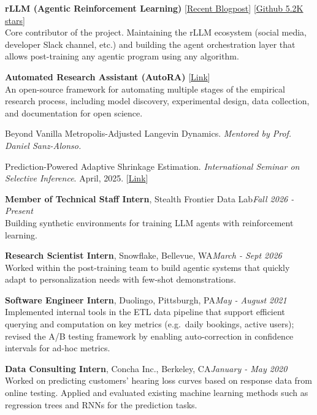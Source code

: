 \documentclass[10pt,letterpaper]{article}
\newlength{\labw}\setlength{\labw}{1.15in}
\newenvironment{sect}[1]{%
  \begin{list}{}{\setlength{\leftmargin}{\labw}\setlength{\labelwidth}{\labw}%
  \setlength{\labelsep}{0pt}\setlength{\itemsep}{0pt}\setlength{\topsep}{0pt}\setlength{\parsep}{0pt}}%
  \item[{\raisebox{0pt}[0pt][0pt]{\parbox[t]{\labw}{\bfseries\raggedright\MakeUppercase{#1}}}}]}%
  {\end{list}\vspace{1.1em}}
\newcommand{\job}[3]{\textbf{#1}, #2\hfill\textit{#3}\\}
\newcommand{\lk}[2]{\href{#1}{#2}}
\begin{document}
\begin{sect}{Open Source}
\textbf{rLLM (Agentic Reinforcement Learning)} [\lk{https://x.com/rllm_project/status/2029289280062013452}{Recent Blogpost}] [\lk{https://github.com/rllm-org/rllm}{Github 5.2K stars}]\\
Core contributor of the project. Maintaining the rLLM ecosystem (social media, developer Slack channel, etc.) and building the agent orchestration layer that allows post-training any agentic program using any algorithm.\par\vspace{0.7em}
\textbf{Automated Research Assistant (AutoRA)} [\lk{https://autoresearch.github.io/autora/}{Link}]\\
An open-source framework for automating multiple stages of the empirical research process, including model discovery, experimental design, data collection, and documentation for open science.
\end{sect}

\begin{sect}{Thesis}
Beyond Vanilla Metropolis-Adjusted Langevin Dynamics. \textit{Mentored by Prof. Daniel Sanz-Alonso.}
\end{sect}

\begin{sect}{Invited Talk}
Prediction-Powered Adaptive Shrinkage Estimation. \textit{International Seminar on Selective Inference}. April, 2025. [\lk{https://www.selectiveinferenceseminar.com/past-talks}{Link}]
\end{sect}

\begin{sect}{Work\\Experience}
\job{Member of Technical Staff Intern}{Stealth Frontier Data Lab}{Fall 2026 - Present}
Building synthetic environments for training LLM agents with reinforcement learning.\par\vspace{0.7em}
\job{Research Scientist Intern}{Snowflake, Bellevue, WA}{March - Sept 2026}
Worked within the post-training team to build agentic systems that quickly adapt to personalization needs with few-shot demonstrations.\par\vspace{0.7em}
\job{Software Engineer Intern}{Duolingo, Pittsburgh, PA}{May - August 2021}
Implemented internal tools in the ETL data pipeline that support efficient querying and computation on key metrics (e.g.\ daily bookings, active users); revised the A/B testing framework by enabling auto-correction in confidence intervals for ad-hoc metrics.\par\vspace{0.7em}
\job{Data Consulting Intern}{Concha Inc., Berkeley, CA}{January - May 2020}
Worked on predicting customers' hearing loss curves based on response data from online testing. Applied and evaluated existing machine learning methods such as regression trees and RNNs for the prediction tasks.
\end{sect}
\end{document}
